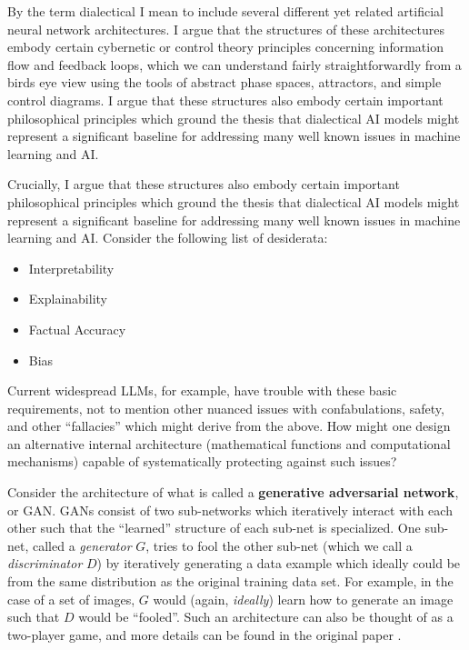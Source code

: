 \documentclass[11pt, oneside]{article}   	%
\begin{document}
By the term dialectical I mean to include several different yet related artificial neural network architectures.  I argue that the structures of these architectures embody certain cybernetic or control theory principles concerning information flow and feedback loops, which we can understand fairly straightforwardly from a birds eye view using the tools of abstract phase spaces, attractors, and simple control diagrams.  I argue that these structures also embody certain important philosophical principles which ground the thesis that dialectical AI models might represent a significant baseline for addressing many well known issues in machine learning and AI.





Crucially, I argue that these structures also embody certain important philosophical principles which ground the thesis that dialectical AI models might represent a significant baseline for addressing many well known issues in machine learning and AI.  Consider the following list of desiderata:


\begin{itemize}
    \item Interpretability
    \item Explainability
    \item Factual Accuracy
    \item Bias
\end{itemize}

Current widespread LLMs, for example, have trouble with these basic requirements, not to mention other nuanced issues with confabulations, safety, and other ``fallacies'' which might derive from the above.  How might one design an alternative internal architecture (mathematical functions and computational mechanisms) capable of systematically protecting against such issues?  


Consider the architecture of what is called a \textbf{generative adversarial network}, or GAN.  GANs consist of two sub-networks which iteratively interact with each other such that the ``learned'' structure of each sub-net is specialized.  One sub-net, called a \emph{generator} $G$, tries to fool the other sub-net (which we call a \emph{discriminator} $D$) by iteratively generating a data example which ideally could be from the same distribution as the original training data set.  For example, in the case of a set of images, $G$ would (again, \emph{ideally}) learn how to generate an image such that $D$ would be ``fooled''.  Such an architecture can also be thought of as a two-player game, and more details can be found in the original paper .  \citep{}
\end{document}
